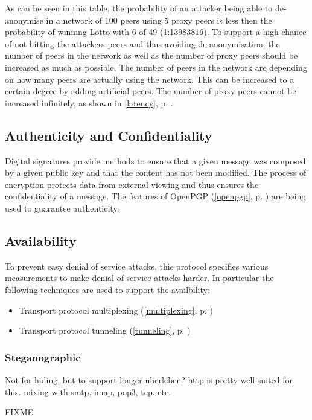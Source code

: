 As can be seen in this table, the probability of an attacker being able to
de-anonymise in a network of 100 peers using 5 proxy peers is less then
the probability of winning Lotto with 6 of 49 (1:13983816).
To support a high chance of not hitting the attackers peers and thus
avoiding de-anonymisation, the number of peers in the network as well 
as the number of proxy peers should be increased as much as possible. 
The number of peers in the network are
depending on how many peers are actually using the network. This can be
increased to a certain degree by adding artificial peers.
The number of proxy peers cannot be increased infinitely, 
as shown in \ref{latency}, p. \pageref{latency}.
\subsection{Authenticity and Confidentiality}
Digital signatures provide methods to ensure that a given message
was composed by a given public key and that the content has not been
modified. 
The process of encryption protects data from external
viewing and thus ensures the confidentiality of a message.
The features of OpenPGP (\ref{openpgp}, p. \pageref{openpgp})
are being used to guarantee authenticity.
\subsection{Availability}
To prevent easy denial of service attacks, this protocol specifies various
measurements to make denial of service attacks harder. In particular
the following techniques are used to support the availbility:
\begin{itemize}
\item Transport protocol multiplexing (\ref{multiplexing}, p. \pageref{multiplexing})
\item Transport protocol tunneling (\ref{tunneling}, p. \pageref{tunneling})
\end{itemize}

\subsubsection{Steganographic}
Not for hiding, but to support longer überleben?
http is pretty well suited for this.
mixing with smtp, imap, pop3, tcp. etc.

FIXME 

